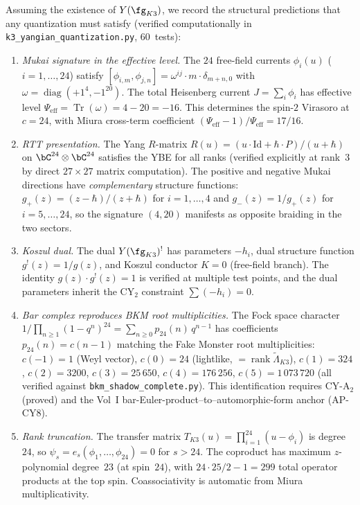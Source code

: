 \begin{remark}
\label{rem:k3-yangian-quantization}
Assuming the existence of $Y(\fg_{K3})$, we record the structural
predictions that any quantization must satisfy
(verified computationally in
\texttt{k3\_yangian\_quantization.py}, 60~tests):
\begin{enumerate}
\item \emph{Mukai signature in the effective level.}
The $24$ free-field currents $\phi_i(u)$ ($i = 1, \ldots, 24$)
satisfy $[\phi_{i,m}, \phi_{j,n}] = \omega^{ij} \cdot m \cdot
\delta_{m+n,0}$ with $\omega = \operatorname{diag}(+1^4, -1^{20})$.
The total Heisenberg current $J = \sum_i \phi_i$ has effective level
$\Psi_{\mathrm{eff}} = \operatorname{Tr}(\omega) = 4 - 20 = -16$.
This determines the spin-$2$ Virasoro at $c = 24$, with Miura
cross-term coefficient $(\Psi_{\mathrm{eff}} - 1)/\Psi_{\mathrm{eff}} = 17/16$.

\item \emph{RTT presentation.}
The Yang $R$-matrix
$R(u) = (u \cdot \mathrm{Id} + \hbar \cdot P)/(u + \hbar)$
on $\bC^{24} \otimes \bC^{24}$ satisfies the YBE for all ranks
(verified explicitly at rank~$3$ by direct $27 \times 27$ matrix
computation).
The positive and negative Mukai directions have \emph{complementary}
structure functions:
$g_+(z) = (z - \hbar)/(z + \hbar)$ for $i = 1, \ldots, 4$ and
$g_-(z) = 1/g_+(z)$ for $i = 5, \ldots, 24$, so the signature
$(4, 20)$ manifests as opposite braiding in the two sectors.

\item \emph{Koszul dual.}
The dual $Y(\fg_{K3})^!$ has parameters $-h_i$, dual structure
function $g^!(z) = 1/g(z)$, and Koszul conductor $K = 0$
(free-field branch).
The identity $g(z) \cdot g^!(z) = 1$ is verified at multiple
test points, and the dual parameters inherit the CY$_2$ constraint
$\sum(-h_i) = 0$.

\item \emph{Bar complex reproduces BKM root multiplicities.}
The Fock space character
$1/\prod_{n \geq 1}(1-q^n)^{24} = \sum_{n \geq 0} p_{24}(n)\, q^{n-1}$
has coefficients $p_{24}(n) = c(n-1)$ matching the Fake Monster
root multiplicities: $c(-1) = 1$ (Weyl vector),
$c(0) = 24$ (lightlike, $= \operatorname{rank} \widetilde{\Lambda}_{K3}$),
$c(1) = 324$, $c(2) = 3200$, $c(3) = 25\,650$, $c(4) = 176\,256$,
$c(5) = 1\,073\,720$ (all verified against
\texttt{bkm\_shadow\_complete.py}).
This identification requires CY-A$_2$ (proved) and the Vol~I
bar-Euler-product--to--automorphic-form anchor (AP-CY8).

\item \emph{Rank truncation.}
The transfer matrix $T_{K3}(u) = \prod_{i=1}^{24}(u - \phi_i)$ is
degree~$24$, so $\psi_s = e_s(\phi_1, \ldots, \phi_{24}) = 0$ for
$s > 24$.
The coproduct has maximum $z$-polynomial degree~$23$ (at spin~$24$),
with $24 \cdot 25/2 - 1 = 299$ total operator products at the top spin.
Coassociativity is automatic from Miura multiplicativity.
\end{enumerate}
\end{remark}


